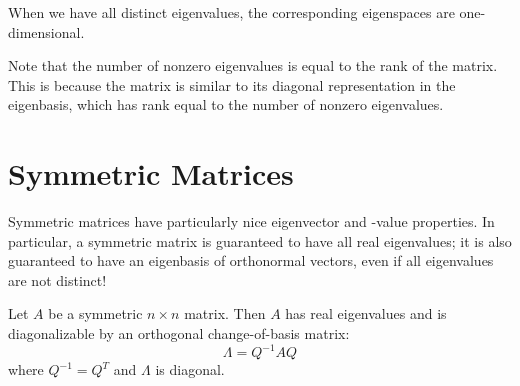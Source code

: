 When we have all distinct eigenvalues, the corresponding eigenspaces are one-dimensional.

Note that the number of nonzero eigenvalues is equal to the rank of the matrix. This is because the matrix is similar to its diagonal representation in the eigenbasis, which has rank equal to the number of nonzero eigenvalues.





\chapter{Symmetric Matrices}
Symmetric matrices have particularly nice eigenvector and -value properties. In particular, a symmetric matrix is guaranteed to have all real eigenvalues; it is also guaranteed to have an eigenbasis of orthonormal vectors, even if all eigenvalues are not distinct!

\begin{theorem}
Let $A$ be a symmetric $n\times n$ matrix. Then $A$ has real eigenvalues and is diagonalizable by an orthogonal change-of-basis matrix: \[ \Lambda = Q^{-1}AQ \] where $Q^{-1} = Q^T$ and $\Lambda $ is diagonal.
\end{theorem}


